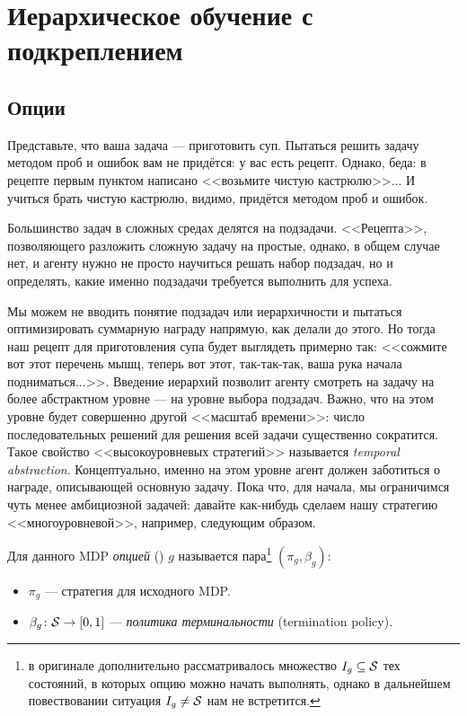 \section{Иерархическое обучение с подкреплением}

\subsection{Опции}

Представьте, что ваша задача --- приготовить суп. Пытаться решить задачу методом проб и ошибок вам не придётся: у вас есть рецепт. Однако, беда: в рецепте первым пунктом написано <<возьмите чистую кастрюлю>>... И учиться брать чистую кастрюлю, видимо, придётся методом проб и ошибок.

Большинство задач в сложных средах делятся на подзадачи. <<Рецепта>>, позволяющего разложить сложную задачу на простые, однако, в общем случае нет, и агенту нужно не просто научиться решать набор подзадач, но и определять, какие именно подзадачи требуется выполнить для успеха.

Мы можем не вводить понятие подзадач или иерархичности и пытаться оптимизировать суммарную награду напрямую, как делали до этого. Но тогда наш рецепт для приготовления супа будет выглядеть примерно так: <<сожмите вот этот перечень мышц, теперь вот этот, так-так-так, ваша рука начала подниматься...>>. Введение иерархий позволит агенту смотреть на задачу на более абстрактном уровне --- на уровне выбора подзадач. Важно, что на этом уровне будет совершенно другой <<масштаб времени>>: число последовательных решений для решения всей задачи существенно сократится. Такое свойство <<высокоуровневых стратегий>> называется \emph{temporal abstraction}. Концептуально, именно на этом уровне агент должен заботиться о награде, описывающей основную задачу. Пока что, для начала, мы ограничимся чуть менее амбициозной задачей: давайте как-нибудь сделаем нашу стратегию <<многоуровневой>>, например, следующим образом.

\begin{definition}
\setcounter{footnote}{1}
Для данного MDP \emph{опцией} () $g$ называется пара\footnote{в оригинале дополнительно рассматривалось множество $I_g \subseteq \mathcal{S}$ тех состояний, в которых опцию можно начать выполнять, однако в дальнейшем повествовании ситуация $I_g \ne \mathcal{S}$ нам не встретится.} $(\pi_g, \beta_g)$:
\begin{itemize}
    \item $\pi_g$ --- стратегия для исходного MDP.
    \item $\beta_g \colon \mathcal{S} \to [0, 1]$ --- \emph{политика терминальности} (termination policy).
\end{itemize}
\end{definition}


